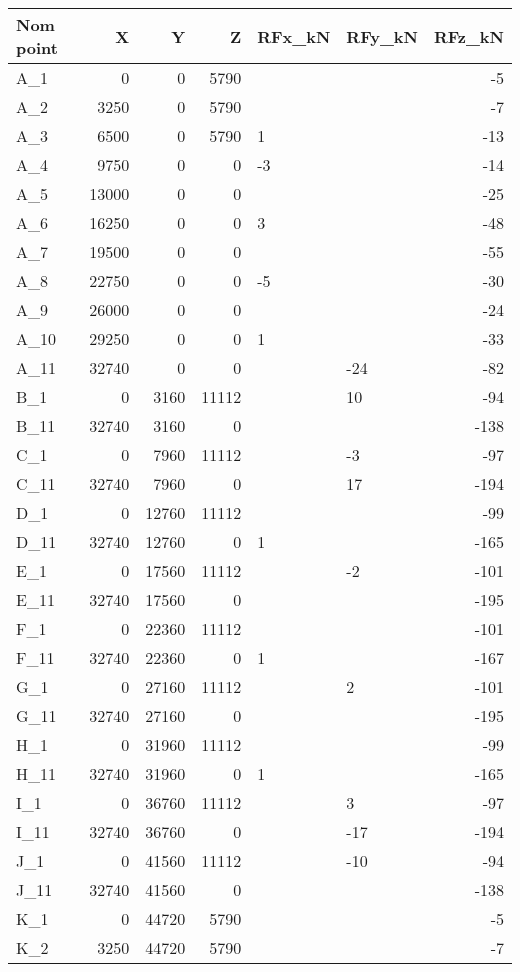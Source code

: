 \begin{tabular}{lrrrllr}
\toprule
Nom point & X & Y & Z & RFx\_kN & RFy\_kN & RFz\_kN \\
\midrule
A\_1 & 0 & 0 & 5790 &  &  & -5 \\
A\_2 & 3250 & 0 & 5790 &  &  & -7 \\
A\_3 & 6500 & 0 & 5790 & 1 &  & -13 \\
A\_4 & 9750 & 0 & 0 & -3 &  & -14 \\
A\_5 & 13000 & 0 & 0 &  &  & -25 \\
A\_6 & 16250 & 0 & 0 & 3 &  & -48 \\
A\_7 & 19500 & 0 & 0 &  &  & -55 \\
A\_8 & 22750 & 0 & 0 & -5 &  & -30 \\
A\_9 & 26000 & 0 & 0 &  &  & -24 \\
A\_10 & 29250 & 0 & 0 & 1 &  & -33 \\
A\_11 & 32740 & 0 & 0 &  & -24 & -82 \\
B\_1 & 0 & 3160 & 11112 &  & 10 & -94 \\
B\_11 & 32740 & 3160 & 0 &  &  & -138 \\
C\_1 & 0 & 7960 & 11112 &  & -3 & -97 \\
C\_11 & 32740 & 7960 & 0 &  & 17 & -194 \\
D\_1 & 0 & 12760 & 11112 &  &  & -99 \\
D\_11 & 32740 & 12760 & 0 & 1 &  & -165 \\
E\_1 & 0 & 17560 & 11112 &  & -2 & -101 \\
E\_11 & 32740 & 17560 & 0 &  &  & -195 \\
F\_1 & 0 & 22360 & 11112 &  &  & -101 \\
F\_11 & 32740 & 22360 & 0 & 1 &  & -167 \\
G\_1 & 0 & 27160 & 11112 &  & 2 & -101 \\
G\_11 & 32740 & 27160 & 0 &  &  & -195 \\
H\_1 & 0 & 31960 & 11112 &  &  & -99 \\
H\_11 & 32740 & 31960 & 0 & 1 &  & -165 \\
I\_1 & 0 & 36760 & 11112 &  & 3 & -97 \\
I\_11 & 32740 & 36760 & 0 &  & -17 & -194 \\
J\_1 & 0 & 41560 & 11112 &  & -10 & -94 \\
J\_11 & 32740 & 41560 & 0 &  &  & -138 \\
K\_1 & 0 & 44720 & 5790 &  &  & -5 \\
K\_2 & 3250 & 44720 & 5790 &  &  & -7 \\

\end{tabular}
